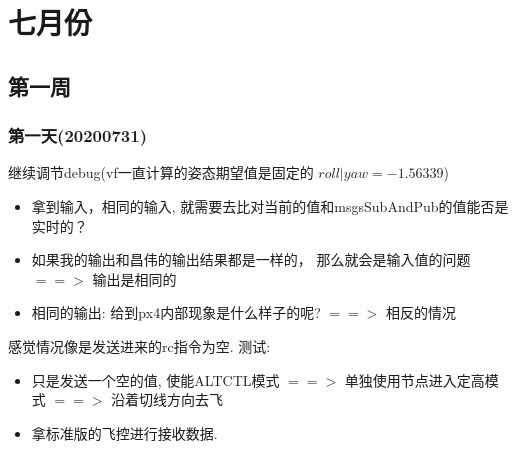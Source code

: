   \chapter{七月份}
    \section{第一周}
    \subsection{第一天(20200731)}
    继续调节debug(vf一直计算的姿态期望值是固定的 $roll | yaw = -1.56339$)
    \begin{itemize}
      \item 拿到输入，相同的输入, 就需要去比对当前的值和msgsSubAndPub的值能否是实时的？
      \item 如果我的输出和昌伟的输出结果都是一样的， 那么就会是输入值的问题 $==>$ 输出是相同的
      \item 相同的输出: 给到px4内部现象是什么样子的呢?  $==>$ 相反的情况
    \end{itemize} 
    感觉情况像是发送进来的rc指令为空. 测试: 
    \begin{itemize}
      \item 只是发送一个空的值, 使能ALTCTL模式 $==>$ 单独使用节点进入定高模式 $==>$  沿着切线方向去飞
      \item 拿标准版的飞控进行接收数据. 
    \end{itemize}

